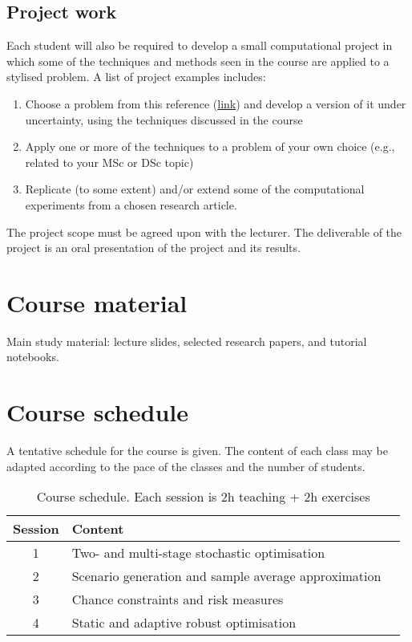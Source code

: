 \documentclass[a4paper]{artikel3}
\begin{document}
\subsection{Project work}

Each student will also be required to develop a small computational project in which some of the techniques and methods seen in the course are applied to a stylised problem. A list of project examples includes:
\begin{enumerate}
	\item Choose a problem from this reference (\href{https://ebookcentral.proquest.com/lib/aalto-ebooks/detail.action?pq-origsite=primo&docID=7103745}{link}) and develop a version of it under uncertainty, using the techniques discussed in the course
	\item Apply one or more of the techniques to a problem of your own choice (e.g., related to your MSc or DSc topic)
	\item Replicate (to some extent) and/or extend some of the computational experiments from a chosen research article.
\end{enumerate}

The project scope must be agreed upon with the lecturer. The deliverable of the project is an oral presentation of the project and its results.


\section{Course material}

Main study material: lecture slides, selected research papers, and tutorial notebooks.


\section{Course schedule}

A tentative schedule for the course is given. The content of each class may be adapted according to the pace of the classes and the number of students. 


\begin{table}[h]
\centering
\begin{tabular}{cll} \hline
	 Session & Content                               				\\ \hline
	 1   & Two- and multi-stage stochastic optimisation 			\\
	 2   & Scenario generation and sample average approximation   \\
	 3   & Chance constraints and risk measures        			\\
	 4   & Static and adaptive robust optimisation     			\\ \hline 
             		
\end{tabular}
\caption{Course schedule. Each session is 2h teaching + 2h exercises}
\end{table}
\end{document}
